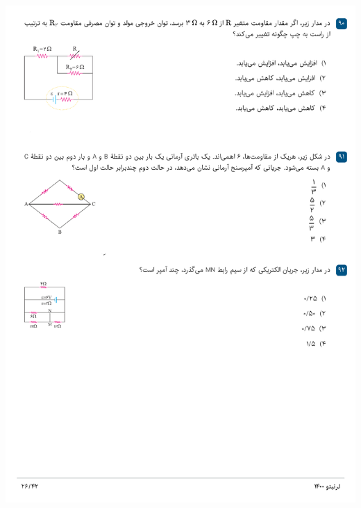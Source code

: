 \documentclass{book}
\begin{document}
\includegraphics[width=\textwidth]{"pages/26"}
\end{document}
